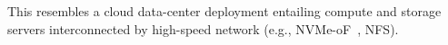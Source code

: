 This resembles a cloud data-center deployment entailing compute and storage servers interconnected by  high-speed network (e.g., NVMe-oF~\cite{nvme_specifications}, NFS).
%






